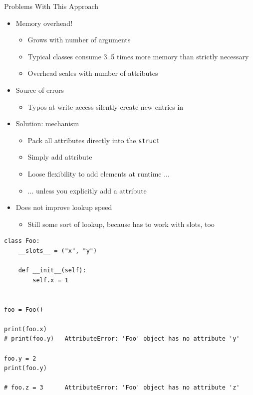 
\begin{frame}{Problems With This Approach}
%
\begin{itemize}
\item Memory overhead!
	\begin{itemize}
	\item Grows with number of arguments
	\item Typical classes consume 3..5 times more memory than strictly necessary
	\item Overhead scales with number of attributes
	\end{itemize}
\item Source of errors
	\begin{itemize}
	\item Typos at write access silently create new entries in 
	\end{itemize}
\item Solution:  mechanism
	\begin{itemize}
	\item Pack all attributes directly into the \texttt{struct}
	\item Simply add  attribute  
	\item[\Thus] Loose flexibility to add elements at runtime ...
	\item[\Thus] ... unless you explicitly add a  attribute
	\end{itemize}
\item Does not improve lookup speed
	\begin{itemize}
	\item Still some sort of  lookup, because  has to work with slots, too
	\end{itemize}
\end{itemize}
%
\end{frame}


\begin{frame}[fragile]
%
\begin{codebox}
\begin{verbatim}
class Foo:
    __slots__ = ("x", "y")
    
    def __init__(self):
        self.x = 1


foo = Foo()

print(foo.x)
# print(foo.y)   AttributeError: 'Foo' object has no attribute 'y'

foo.y = 2
print(foo.y)

# foo.z = 3      AttributeError: 'Foo' object has no attribute 'z'
\end{verbatim}
\end{codebox}
%
\end{frame}

